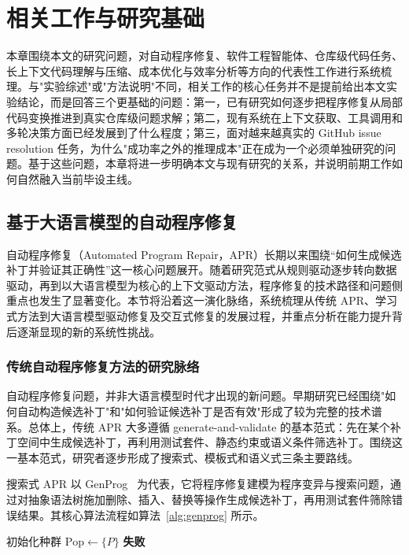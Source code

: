 
\chapter{相关工作与研究基础}
\label{chap:related-works}
本章围绕本文的研究问题，对自动程序修复、软件工程智能体、仓库级代码任务、长上下文代码理解与压缩、成本优化与效率分析等方向的代表性工作进行系统梳理。与"实验综述"或"方法说明"不同，相关工作的核心任务并不是提前给出本文实验结论，而是回答三个更基础的问题：第一，已有研究如何逐步把程序修复从局部代码变换推进到真实仓库级问题求解；第二，现有系统在上下文获取、工具调用和多轮决策方面已经发展到了什么程度；第三，面对越来越真实的 GitHub issue resolution 任务，为什么"成功率之外的推理成本"正在成为一个必须单独研究的问题。基于这些问题，本章将进一步明确本文与现有研究的关系，并说明前期工作如何自然融入当前毕设主线。

\section{基于大语言模型的自动程序修复}

自动程序修复（Automated Program Repair，APR）长期以来围绕“如何生成候选补丁并验证其正确性”这一核心问题展开。随着研究范式从规则驱动逐步转向数据驱动，再到以大语言模型为核心的上下文驱动方法，程序修复的技术路径和问题侧重点也发生了显著变化。本节将沿着这一演化脉络，系统梳理从传统 APR、学习式方法到大语言模型驱动修复及交互式修复的发展过程，并重点分析在能力提升背后逐渐显现的新的系统性挑战。 

\subsection{传统自动程序修复方法的研究脉络}

自动程序修复问题，并非大语言模型时代才出现的新问题。早期研究已经围绕"如何自动构造候选补丁"和"如何验证候选补丁是否有效"形成了较为完整的技术谱系。总体上，传统 APR 大多遵循 generate-and-validate 的基本范式：先在某个补丁空间中生成候选补丁，再利用测试套件、静态约束或语义条件筛选补丁。围绕这一基本范式，研究者逐步形成了搜索式、模板式和语义式三条主要路线。

搜索式 APR 以 GenProg~\cite{le2011genprog} 为代表，它将程序修复建模为程序变异与搜索问题，通过对抽象语法树施加删除、插入、替换等操作生成候选补丁，再用测试套件筛除错误结果。其核心算法流程如算法~\ref{alg:genprog} 所示。

\begin{algorithm}[H]
\caption{GenProg: 基于遗传编程的自动程序修复}
\label{alg:genprog}
初始化种群 $\text{Pop} \leftarrow \{P\}$\;
\Return \textbf{失败}\;
\end{algorithm}


